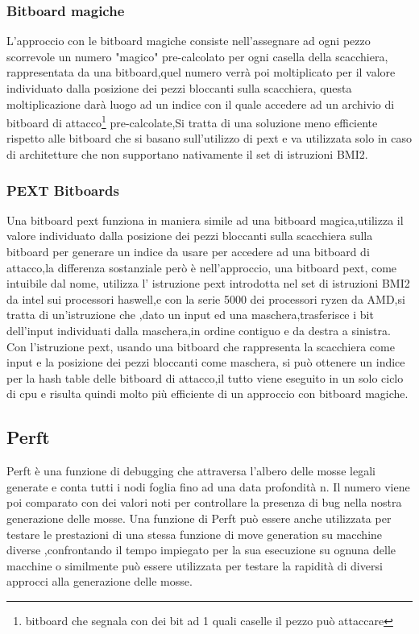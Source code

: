 \subsubsection{Bitboard magiche}
L'approccio con le bitboard magiche consiste nell'assegnare ad ogni pezzo scorrevole un numero "magico" pre-calcolato per ogni casella della scacchiera, rappresentata da una bitboard,quel numero verrà poi moltiplicato
 per il valore individuato dalla posizione dei pezzi bloccanti sulla scacchiera,
questa moltiplicazione darà luogo ad un indice con il quale accedere ad un archivio di bitboard di 
attacco\footnote{bitboard che segnala con dei bit ad 1 quali caselle il pezzo può attaccare} pre-calcolate,Si tratta di una soluzione meno efficiente rispetto alle bitboard che si basano sull'utilizzo di pext
e va utilizzata solo in caso di architetture che non supportano nativamente il set di istruzioni BMI2.


\subsubsection{PEXT Bitboards}
Una bitboard pext funziona in maniera simile ad una bitboard magica,utilizza il valore individuato dalla posizione dei pezzi bloccanti sulla scacchiera sulla bitboard per generare un indice da usare per accedere ad una
bitboard di attacco,la differenza sostanziale però è nell'approccio, una bitboard pext, come intuibile dal nome, utilizza l' istruzione pext introdotta nel set di istruzioni BMI2 da intel sui processori haswell,e con 
la serie 5000 dei processori ryzen da AMD,si tratta di un'istruzione che ,dato un input ed una maschera,trasferisce i bit dell'input individuati dalla maschera,in ordine contiguo e da destra a sinistra.
Con l'istruzione pext, usando una bitboard che rappresenta la scacchiera come input e la posizione dei pezzi bloccanti come maschera, si può ottenere un indice per la hash table delle bitboard di attacco,il tutto viene eseguito in un solo ciclo 
di cpu e risulta quindi molto più efficiente di un approccio con bitboard magiche.




\subsection{Perft}
Perft è una funzione di debugging che attraversa l'albero delle mosse legali generate e conta tutti i nodi foglia fino ad una data profondità n.
Il numero viene poi comparato con dei valori noti per controllare la presenza di bug nella nostra generazione delle mosse.
Una funzione di Perft può essere anche utilizzata per testare le prestazioni di una stessa funzione di move generation su macchine diverse ,confrontando il tempo impiegato per la sua esecuzione su ognuna delle macchine
o similmente può essere utilizzata per testare la rapidità di diversi approcci alla generazione delle mosse.


